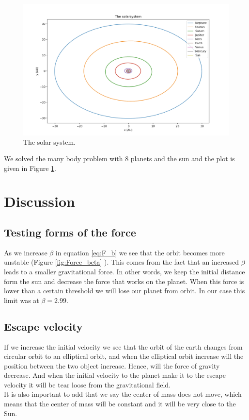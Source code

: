 \documentclass{article}
\begin{document}
\begin{multicols}{2}
\begin{figure}[H]
	\centering
	\includegraphics[width=\linewidth]{Solar}
	\caption{The solar system.}
	\label{fig:Solar}
\end{figure}

We solved the many body problem with 8 planets and the sun and the plot is given in Figure \ref{fig:Solar}. 

\section{Discussion}
\subsection{Testing forms of the force}


As we increase $\beta$ in equation \ref{eq:F_b} we see that the orbit becomes more unstable (Figure \ref{fig:Force_beta} ). This comes from the fact that an increased $\beta$ leads to a smaller gravitational force. In other words, we keep the initial distance form the sun and decrease the force that works on the planet. When this force is lower than a certain threshold we will lose our planet from orbit. In our case this limit was at $\beta=2.99$.  


\subsection{Escape velocity}
If we increase the initial velocity we see that the orbit of the earth changes from circular orbit to an elliptical orbit, and when the elliptical orbit increase will the position between the two object increase. Hence, will the force of gravity decrease. And when the initial velocity to the planet make it to the escape velocity it will be tear loose from the gravitational field.\\
It is also important to add that we say the center of mass does not move, which means that the center of mass will be constant and it will be very close to the Sun.  


\end{multicols}
\end{document}
